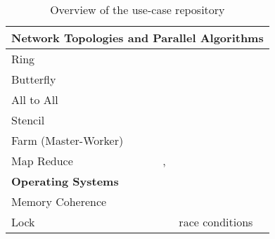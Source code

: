 \begin{table}
\begin{center}
\begin{tabular}{|l|l|l|l|}
	\hline
	\hline
	\multicolumn{4}{|l|}{ \textbf{Network Topologies and Parallel Algorithms}}
	\\
	\hline
	Ring & \cite{BerkleyPar} & \MPI &
	\\
	Butterfly & \cite{BerkleyPar} & \MPI &
	\\
	All to All & \cite{BerkleyPar} & \MPI &
	\\
	Stencil & \cite{BerkleyPar} & \MPI &
	\\
	Farm (Master-Worker) & \cite{BerkleyPar} & \MPI &
	\\
	Map Reduce & \cite{BerkleyPar} & \MPI, \SPython &
	\\
	\hline

	\hline
	\hline
	\multicolumn{4}{|l|}{\textbf{Operating Systems}}
	\\
	\hline %
	Memory Coherence & \cite{memoryCoherence} & \TypeState &
	\\
	Lock & \cite{Lock} & \ESJ & race conditions
	\\
	\hline
\end{tabular}
\end{center}
\caption{Overview of the use-case repository }
\label{table:use_cases_all}
\end{table}

